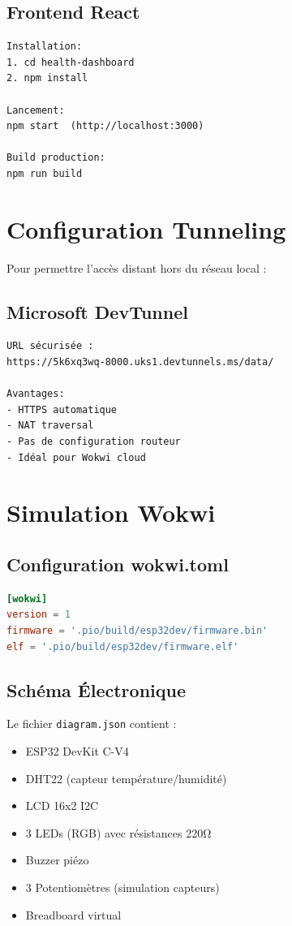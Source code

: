 \documentclass[12pt,french]{report}
\begin{document}
\subsection{Frontend React}

\begin{verbatim}
Installation:
1. cd health-dashboard
2. npm install

Lancement:
npm start  (http://localhost:3000)

Build production:
npm run build
\end{verbatim}

\section{Configuration Tunneling}

Pour permettre l'accès distant hors du réseau local :

\subsection{Microsoft DevTunnel}

\begin{verbatim}
URL sécurisée :
https://5k6xq3wq-8000.uks1.devtunnels.ms/data/

Avantages:
- HTTPS automatique
- NAT traversal
- Pas de configuration routeur
- Idéal pour Wokwi cloud
\end{verbatim}

\section{Simulation Wokwi}

\subsection{Configuration wokwi.toml}

\begin{lstlisting}[language=toml]
[wokwi]
version = 1
firmware = '.pio/build/esp32dev/firmware.bin'
elf = '.pio/build/esp32dev/firmware.elf'
\end{lstlisting}

\subsection{Schéma Électronique}

Le fichier \texttt{diagram.json} contient :
\begin{itemize}
    \item ESP32 DevKit C-V4
    \item DHT22 (capteur température/humidité)
    \item LCD 16x2 I2C
    \item 3 LEDs (RGB) avec résistances 220Ω
    \item Buzzer piézo
    \item 3 Potentiomètres (simulation capteurs)
    \item Breadboard virtual
\end{itemize}
\end{document}
